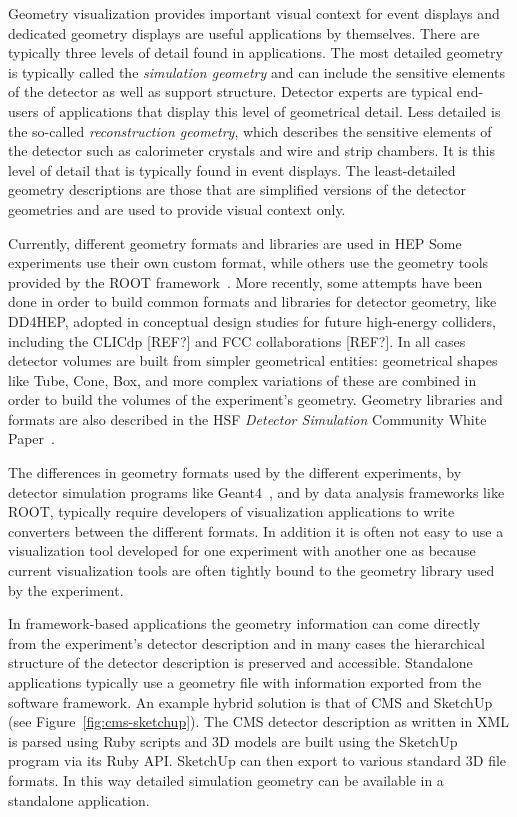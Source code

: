 \documentclass[12pt,a4paper]{article}
\begin{document}
Geometry visualization provides important visual context for event displays and dedicated geometry displays are useful
applications by themselves. There are typically three levels of detail found in applications. The most detailed geometry
is typically called the \textit{simulation geometry} and can include the sensitive elements of the detector as well
as support structure. Detector experts are typical end-users of applications that display this level of geometrical detail. Less
detailed is the so-called \textit{reconstruction geometry}, which describes the sensitive elements of the detector
such as calorimeter crystals and wire and strip chambers. It is this level of detail that is typically found in
event displays. The least-detailed geometry descriptions are those that are simplified versions of the
detector geometries and are used to provide visual context only.

Currently, different geometry formats and libraries are used in HEP
Some experiments use their own custom format, while others use the geometry tools provided by the ROOT framework~\cite{Root1997}.
More recently, some attempts have been done in order to build common formats and libraries for detector geometry, like DD4HEP,
adopted in conceptual design studies for future high-energy colliders, including the CLICdp [REF?] and FCC collaborations [REF?].
In all cases detector volumes are built from simpler geometrical entities: geometrical shapes like Tube, Cone, Box, and
more complex variations of these are combined in order to build the volumes of the experiment’s geometry.
Geometry libraries and formats are also described in the HSF \textit{Detector Simulation} Community White Paper~\cite{HSF-CWP-2017-07}.

The differences in geometry formats used by the different experiments, by detector simulation programs like Geant4~\cite{Geant4},
and by data analysis frameworks like ROOT, typically require developers of visualization applications to write converters
between the different formats. In addition it is often not easy to use a visualization tool developed for one experiment with another one as
because current visualization tools are often tightly bound to the geometry library used by the experiment.

In framework-based applications the geometry information can come directly from the experiment's detector description and in
 many cases the hierarchical structure of the detector description is preserved and accessible. Standalone applications
typically use a geometry file with information exported from the software framework. An example hybrid solution is that
of CMS and SketchUp~\cite{CMSSketchUp} (see Figure~\ref{fig:cms-sketchup}).
The CMS detector description as written in XML is parsed using Ruby scripts and 3D models are built using the
SketchUp program via its Ruby API. SketchUp can then export to various standard 3D file formats. In this way
detailed simulation geometry can be available in a standalone application.
\end{document}
